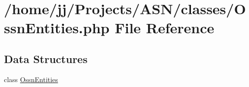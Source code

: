 \hypertarget{_ossn_entities_8php}{}\section{/home/jj/\+Projects/\+A\+S\+N/classes/\+Ossn\+Entities.php File Reference}
\label{_ossn_entities_8php}
\subsection*{Data Structures}
\begin{DoxyCompactItemize}
\item 
class \hyperlink{class_ossn_entities}{Ossn\+Entities}
\end{DoxyCompactItemize}
